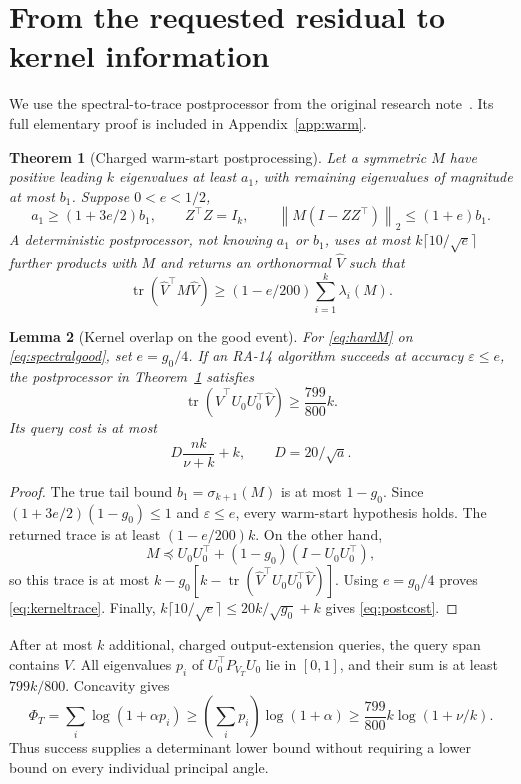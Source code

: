\documentclass[11pt]{article}
\numberwithin{equation}{section}
\newtheorem{theorem}{Theorem}[section]
\newtheorem{lemma}[theorem]{Lemma}
\theoremstyle{remark}\newtheorem{remark}[theorem]{Remark}
\newcommand{\eps}{\varepsilon}
\newcommand{\norm}[1]{\left\lVert #1\right\rVert}
\newcommand{\tr}{\operatorname{tr}}
\begin{document}
\section{From the requested residual to kernel information}\label{sec:bridge}
We use the spectral-to-trace postprocessor from the original research note~\cite{prior1}. Its full elementary proof is included in Appendix~\ref{app:warm}.

\begin{theorem}[Charged warm-start postprocessing]\label{thm:warm}
Let a symmetric $M$ have positive leading $k$ eigenvalues at least $a_1$, with remaining eigenvalues of magnitude at most $b_1$. Suppose $0<e<1/2$,
\[
a_1\ge(1+3e/2)b_1,\qquad Z^\top Z=I_k,\qquad
\norm{M(I-ZZ^\top)}_2\le(1+e)b_1.
\]
A deterministic postprocessor, not knowing $a_1$ or $b_1$, uses at most $k\lceil10/\sqrt e\rceil$ further products with $M$ and returns an orthonormal $\widehat V$ such that
\[
\tr(\widehat V^\top M\widehat V)\ge(1-e/200)\sum_{i=1}^k\lambda_i(M).
\]
\end{theorem}

\begin{lemma}[Kernel overlap on the good event]\label{lem:tracekernel}
For \eqref{eq:hardM} on \eqref{eq:spectralgood}, set $e=g_0/4$. If an RA-14 algorithm succeeds at accuracy $\eps\le e$, the postprocessor in Theorem~\ref{thm:warm} satisfies
\begin{equation}\label{eq:kerneltrace}
\tr(\widehat V^\top U_0U_0^\top\widehat V)\ge\frac{799}{800}k.
\end{equation}
Its query cost is at most
\begin{equation}\label{eq:postcost}
D\frac{nk}{\nu+k}+k,\qquad D=20/\sqrt a.
\end{equation}
\end{lemma}
\begin{proof}
The true tail bound $b_1=\sigma_{k+1}(M)$ is at most $1-g_0$. Since $(1+3e/2)(1-g_0)\le1$ and $\eps\le e$, every warm-start hypothesis holds. The returned trace is at least $(1-e/200)k$. On the other hand,
\[
M\preceq U_0U_0^\top+(1-g_0)(I-U_0U_0^\top),
\]
so this trace is at most
$k-g_0[k-\tr(\widehat V^\top U_0U_0^\top\widehat V)]$.
Using $e=g_0/4$ proves \eqref{eq:kerneltrace}. Finally,
$k\lceil10/\sqrt e\rceil\le20k/\sqrt{g_0}+k$ gives \eqref{eq:postcost}.
\end{proof}
After at most $k$ additional, charged output-extension queries, the query span contains $\widehat V$. All eigenvalues $p_i$ of $U_0^\top P_{V_T}U_0$ lie in $[0,1]$, and their sum is at least $799k/800$. Concavity gives
\begin{equation}\label{eq:PhiSuccess}
\Phi_T=\sum_i\log(1+\alpha p_i)
\ge\left(\sum_i p_i\right)\log(1+\alpha)
\ge\frac{799}{800}k\log(1+\nu/k).
\end{equation}
Thus success supplies a determinant lower bound without requiring a lower bound on every individual principal angle.
\end{document}
